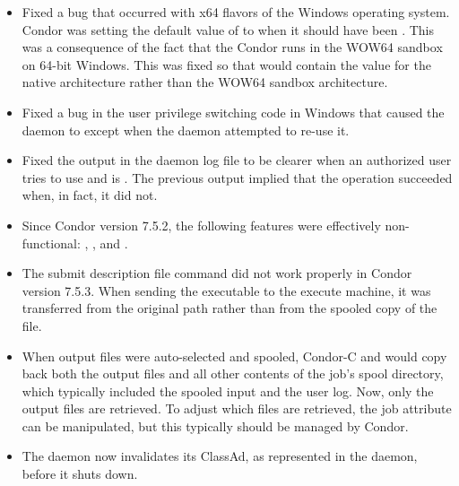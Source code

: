 \begin{itemize}

\item Fixed a bug that occurred with x64 flavors of the Windows operating system. 
  Condor was setting the default value of  to  when it 
  should have been .  This was a consequence of the fact that the 
  Condor runs in the WOW64 sandbox on 64-bit Windows.  This was fixed so that
   would contain the value for the native architecture rather than 
  the WOW64 sandbox architecture.

\item Fixed a bug in the user privilege switching code in Windows that 
  caused the  daemon to except when the  
  daemon attempted to re-use it. 

\item Fixed the output in the  daemon log file to be
  clearer when an authorized user tries to use 
   and  is .
  The previous
  output implied that the operation succeeded when, in fact, it did not.

\item Since Condor version 7.5.2,
  the following  features were
  effectively non-functional: ,
  , and .

\item The submit description file command 
  did not work properly in Condor version 7.5.3.
  When sending the executable to the execute machine, it was
  transferred from the original path rather than from the spooled copy
  of the file.

\item When output files were auto-selected and spooled, Condor-C and
   would copy back both the output files and
  all other contents of the job's spool directory, which typically
  included the spooled input and the user log.  
  Now, only the output files are retrieved.
  To adjust which files are retrieved, the job
  attribute  can be manipulated, but this
  typically should be managed by Condor.

\item The  daemon now invalidates its ClassAd,
  as represented in the  daemon, before it shuts down.


\end{itemize}
